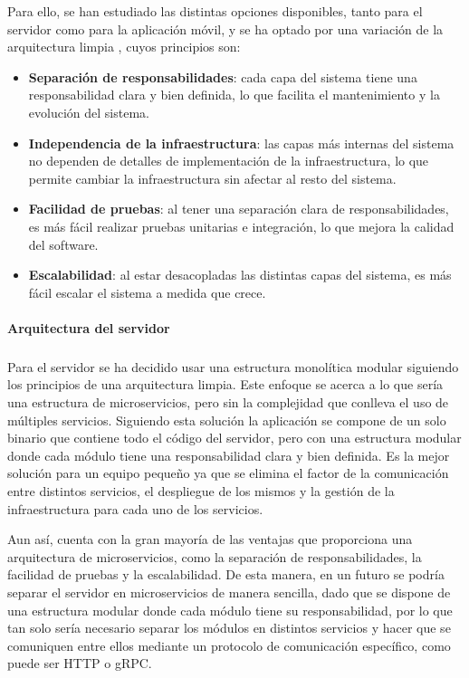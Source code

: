 Para ello, se han estudiado las distintas opciones disponibles, tanto para el servidor como para la aplicación móvil, y se ha optado por una variación de la arquitectura limpia \parencite{uncle-bob-clean-architecture}, cuyos principios son:
\begin{itemize}
    \item \textbf{Separación de responsabilidades}: cada capa del sistema tiene una responsabilidad clara y bien definida, lo que facilita el mantenimiento y la evolución del sistema.
    \item \textbf{Independencia de la infraestructura}: las capas más internas del sistema no dependen de detalles de implementación de la infraestructura, lo que permite cambiar la infraestructura sin afectar al resto del sistema.
    \item \textbf{Facilidad de pruebas}: al tener una separación clara de responsabilidades, es más fácil realizar pruebas unitarias e integración, lo que mejora la calidad del software.
    \item \textbf{Escalabilidad}: al estar desacopladas las distintas capas del sistema, es más fácil escalar el sistema a medida que crece.
\end{itemize}

\paragraph{Arquitectura del servidor}
\subparagraph{}
Para el servidor se ha decidido usar una estructura monolítica modular siguiendo los principios de una arquitectura limpia.
Este enfoque se acerca a lo que sería una estructura de microservicios, pero sin la complejidad que conlleva el uso de múltiples servicios.
Siguiendo esta solución la aplicación se compone de un solo binario que contiene todo el código del servidor, pero con una estructura modular donde cada módulo tiene una responsabilidad clara y bien definida.
Es la mejor solución para un equipo pequeño ya que se elimina el factor de la comunicación entre distintos servicios, el despliegue de los mismos y la gestión de la infraestructura para cada uno de los servicios.

Aun así, cuenta con la gran mayoría de las ventajas que proporciona una arquitectura de microservicios, como la separación de responsabilidades, la facilidad de pruebas y la escalabilidad.
De esta manera, en un futuro se podría separar el servidor en microservicios de manera sencilla, dado que se dispone de una estructura modular donde cada módulo tiene su responsabilidad, por lo que tan solo sería necesario separar los módulos en distintos servicios y hacer que se comuniquen entre ellos mediante un protocolo de comunicación específico, como puede ser HTTP o gRPC.


